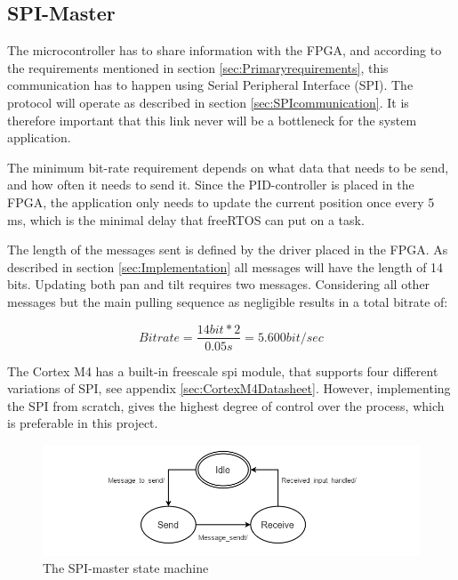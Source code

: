 \subsection{SPI-Master}
\label{sec:SPIMaster}

The microcontroller has to share information with the FPGA, and according to the requirements mentioned in section \ref{sec:Primaryrequirements}, this communication has to happen using Serial Peripheral Interface (SPI). The protocol will operate as described in section \ref{sec:SPIcommunication}. It is therefore important that this link never will be a bottleneck for the system application. 

The minimum bit-rate requirement depends on what data that needs to be send, and how often it needs to send it. Since the PID-controller is placed in the FPGA, the application only needs to update the current position once every 5 ms, which is the minimal delay that freeRTOS can put on a task. 

The length of the messages sent is defined by the driver placed in the FPGA. As described in section \ref{sec:Implementation} all messages will have the length of 14 bits. Updating both pan and tilt requires two messages. Considering all other messages but the main pulling sequence as negligible results in a total bitrate of:

\begin{equation}
Bitrate = \frac{
14 bit * 2	
}{
0.05s
} = 5.600 bit/sec 
\end{equation}

The Cortex M4 has a built-in freescale spi module, that supports four different variations of SPI, see appendix \ref{sec:CortexM4Datasheet}. However, implementing the SPI from scratch, gives the highest degree of control over the process, which is preferable in this project. 

\begin{figure}[h]
	\centering
	\includegraphics[scale = 0.7] {Billeder/SPI-master}
	\caption{The SPI-master state machine}
	\label{fig:SPI-master}
\end{figure}

